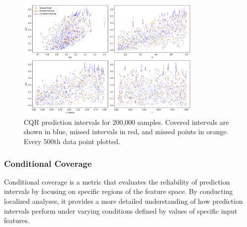 \documentclass{article}
\theoremstyle{definition}
\newcommand{\todo}{{\color{blue}TODO: }}
\begin{document}
\begin{figure}[H]
    \centering
    \includegraphics[width=0.8\textwidth]{reports/figures/3.3-nm-figures/sample_5/CQR_PIs_5.png}
    \caption{CQR prediction intervals for 200,000 samples. Covered intervals are shown in blue, missed intervals in red, and missed points in orange. Every 500th data point plotted.}
    \label{fig:CQR_PIs_5}
\end{figure}


\subsubsection{Conditional Coverage}
Conditional coverage is a metric that evaluates the reliability of prediction intervals by focusing on specific regions of the feature space. By conducting localized analyses, it provides a more detailed understanding of how prediction intervals perform under varying conditions defined by values of specific input features.
\end{document}
